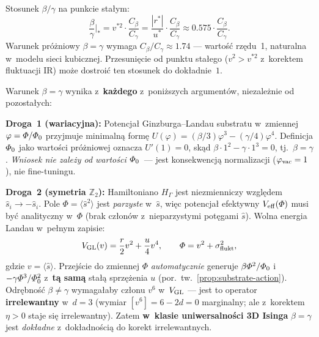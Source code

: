 Stosunek $\beta/\gamma$ na punkcie sta\l{}ym:
\begin{equation}\label{eq:B-bg-ratio}
  \frac{\beta}{\gamma}\biggr|_{*}
  = v^{*2}\cdot\frac{C_\beta}{C_\gamma}
  = \frac{|r^*|}{u^*}\cdot\frac{C_\beta}{C_\gamma}
  \approx 0.575 \cdot \frac{C_\beta}{C_\gamma}.
\end{equation}
Warunek pr\'o\.zniowy $\beta = \gamma$ wymaga
$C_\beta/C_\gamma \approx 1.74$ --- warto\'s\'c rz\k{e}du~1,
naturalna w~modelu sieci kubicznej.
Przesuni\k{e}cie od punktu sta\l{}ego ($v^2 > v^{*2}$
z~korektem fluktuacji IR) mo\.ze dostroi\'c ten stosunek
do dok\l{}adnie~$1$.

\begin{theorem}[Trzy niezale\.zne drogi do $\beta = \gamma$]%
\label{thm:beta-eq-gamma-triple}
Warunek $\beta = \gamma$ wynika z~\textbf{ka\.zdego} z~poni\.zszych
argument\'ow, niezale\.znie od pozosta\l{}ych:

\medskip\noindent
\textbf{Droga~1 (wariacyjna):} Potencja\l{} Ginzburga--Landau substratu
w~zmiennej $\varphi = \Phi/\PhiZero$ przyjmuje minimaln\k{a} form\k{e}
$U(\varphi) = (\beta/3)\varphi^3 - (\gamma/4)\varphi^4$.
Definicja $\PhiZero$ jako warto\'sci pr\'o\.zniowej oznacza
$U'(1) = 0$, sk\k{a}d $\beta\cdot 1^2 - \gamma\cdot 1^3 = 0$,
tj.\ $\beta = \gamma$.
\emph{Wniosek nie zale\.zy od warto\'sci $\PhiZero$}~---
jest konsekwencj\k{a} normalizacji ($\varphi_{\rm vac} = 1$),
nie fine-tuningu.

\medskip\noindent
\textbf{Droga~2 (symetria $\mathbb{Z}_2$):}
Hamiltoniano $H_\Gamma$ jest niezmienniczy wzgl\k{e}dem
$\hat{s}_i \to -\hat{s}_i$. Pole $\Phi = \langle\hat{s}^2\rangle$
jest \emph{parzyste} w~$\hat{s}$, wi\k{e}c potencja\l{} efektywny
$V_{\rm eff}(\Phi)$ musi by\'c analityczny w~$\Phi$ (brak cz\l{}on\'ow
z~nieparzystymi pot\k{e}gami $\hat{s}$). Wolna energia Landau
w~pe\l{}nym zapisie:
\begin{equation}\label{eq:VGL-full}
  V_{\rm GL}(v) = \frac{r}{2}v^2 + \frac{u}{4}v^4,
  \qquad \Phi = v^2 + \sigma^2_{\rm flukt},
\end{equation}
gdzie $v = \langle\hat{s}\rangle$. Przej\'scie do zmiennej $\Phi$
\emph{automatycznie} generuje $\beta\Phi^2/\PhiZero$ i~$-\gamma\Phi^3/\PhiZero^2$
z~\textbf{t\k{a} sam\k{a}} sta\l{}\k{a} sprz\k{e}\.zenia $u$
(por.\ tw.~\ref{prop:substrate-action}). Odr\k{e}bno\'s\'c
$\beta \neq \gamma$ wymaga\l{}aby cz\l{}onu $v^6$ w~$V_{\rm GL}$
--- jest to operator \textbf{irrelewantny} w~$d = 3$
(wymiar $[v^6] = 6 - 2d = 0$ marginalny; ale z~korektem
$\eta > 0$ staje si\k{e} irrelewantny).
Zatem \textbf{w~klasie uniwersalno\'sci 3D Isinga}
$\beta = \gamma$ jest \emph{dok\l{}adne} z~dok\l{}adno\'sci\k{a}
do korekt irrelewantnych.


\end{theorem}
